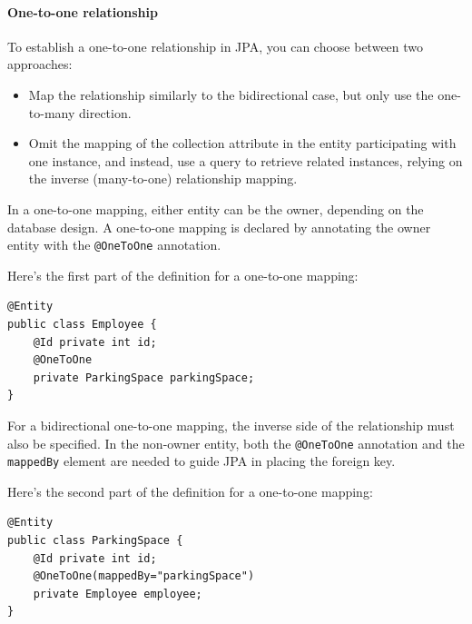 \paragraph*{One-to-one relationship}
To establish a one-to-one relationship in JPA, you can choose between two approaches:
\begin{itemize}
    \item Map the relationship similarly to the bidirectional case, but only use the one-to-many direction.
    \item Omit the mapping of the collection attribute in the entity participating with one instance, and instead, use a query to retrieve related instances, relying on the inverse (many-to-one) relationship mapping.
\end{itemize}
In a one-to-one mapping, either entity can be the owner, depending on the database design. 
A one-to-one mapping is declared by annotating the owner entity with the \texttt{@OneToOne} annotation.
\begin{example}
    Here's the first part of the definition for a one-to-one mapping:
\begin{lstlisting}[style=Java]
@Entity
public class Employee {
    @Id private int id;
    @OneToOne
    private ParkingSpace parkingSpace;
}
\end{lstlisting}
\end{example}
For a bidirectional one-to-one mapping, the inverse side of the relationship must also be specified. 
In the non-owner entity, both the \texttt{@OneToOne} annotation and the \texttt{mappedBy} element are needed to guide JPA in placing the foreign key.
\begin{example}
    Here's the second part of the definition for a one-to-one mapping:
\begin{lstlisting}[style=Java]
@Entity
public class ParkingSpace {
    @Id private int id;
    @OneToOne(mappedBy="parkingSpace")
    private Employee employee;
}
\end{lstlisting}
\end{example}

